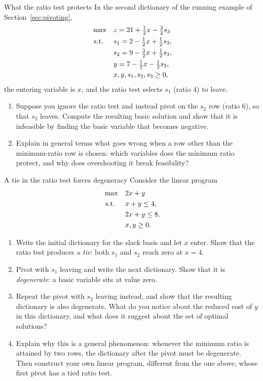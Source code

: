 \begin{ex}{What the ratio test protects}{}
\label{ex:ratio-test-wrong-row}
 In the second dictionary of the running example of Section~\ref{sec:pivoting},
\[
\begin{aligned}
\max\quad & z = 21 + \tfrac12 x - \tfrac32 s_3 \\
\text{ s.t. }\quad & s_1 = 2 - \tfrac12 x + \tfrac12 s_3, \\
& s_2 = 9 - \tfrac32 x + \tfrac12 s_3, \\
& y = 7 - \tfrac12 x - \tfrac12 s_3, \\
& x, y, s_1, s_2, s_3 \geq 0,
\end{aligned}
\]
the entering variable is $x$, and the ratio test selects $s_1$ (ratio $4$) to leave.
\begin{enumerate}
    \item Suppose you ignore the ratio test and instead pivot on the $s_2$ row (ratio $6$), so that $s_2$ leaves.  Compute the resulting basic solution and show that it is infeasible by finding the basic variable that becomes negative.
    \item Explain in general terms what goes wrong when a row other than the minimum-ratio row is chosen: which variables does the minimum ratio protect, and why does overshooting it break feasibility?
\end{enumerate}
\end{ex}


\begin{ex}{A tie in the ratio test forces degeneracy}{}
\label{ex:degenerate-tie}
 Consider the linear program
\[
\begin{aligned}
\max\quad & 2x + y \\
\text{ s.t. }\quad & x + y \leq 4, \\
& 2x + y \leq 8, \\
& x, y \geq 0.
\end{aligned}
\]
\begin{enumerate}
    \item Write the initial dictionary for the slack basis and let $x$ enter.  Show that the ratio test produces a \emph{tie}: both $s_1$ and $s_2$ reach zero at $x = 4$.
    \item Pivot with $s_1$ leaving and write the next dictionary.  Show that it is \emph{degenerate}: a basic variable sits at value zero.
    \item Repeat the pivot with $s_2$ leaving instead, and show that the resulting dictionary is also degenerate.  What do you notice about the reduced cost of $y$ in this dictionary, and what does it suggest about the set of optimal solutions?
    \item Explain why this is a general phenomenon: whenever the minimum ratio is attained by two rows, the dictionary after the pivot must be degenerate.  Then construct your own linear program, different from the one above, whose first pivot has a tied ratio test.
\end{enumerate}
\exrefs{\S\ref{sec:degeneracy}; \S\ref{sec:simplex-algorithm}}
\end{ex}

